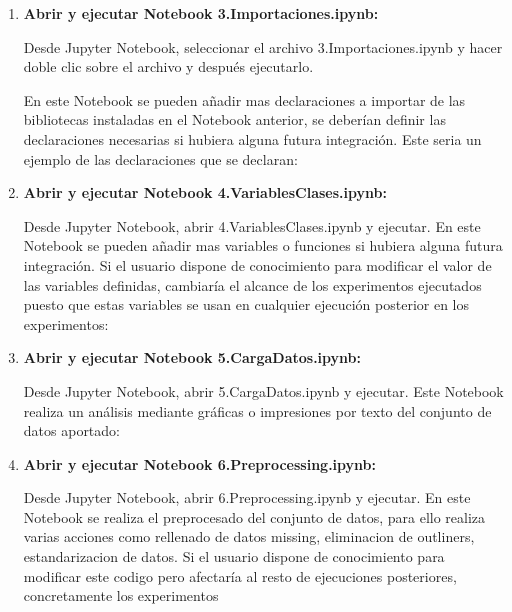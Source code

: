 \begin{enumerate}
\begin{enumerate}
    
    
   \item
    \textbf{Abrir y ejecutar Notebook 3.Importaciones.ipynb:} 
    
    Desde Jupyter Notebook, seleccionar el archivo 3.Importaciones.ipynb y hacer doble clic sobre el archivo y después ejecutarlo.
    
    En este Notebook se pueden añadir mas declaraciones a importar de las bibliotecas instaladas en el Notebook anterior, se deberían definir las declaraciones necesarias si hubiera alguna futura integración. Este seria un ejemplo de las declaraciones que se declaran:
    
    
   \item
    \textbf{Abrir y ejecutar Notebook 4.VariablesClases.ipynb:} 
    
    Desde Jupyter Notebook, abrir 4.VariablesClases.ipynb y ejecutar. En este Notebook se pueden añadir mas variables o funciones si hubiera alguna futura integración.
    Si el usuario dispone de conocimiento para modificar el valor de las variables definidas, cambiaría el alcance de los experimentos ejecutados puesto que estas variables se usan en cualquier ejecución posterior en los experimentos:
    
    
    \item
    \textbf{Abrir y ejecutar Notebook 5.CargaDatos.ipynb:} 
    
    Desde Jupyter Notebook, abrir 5.CargaDatos.ipynb y ejecutar. Este Notebook realiza un análisis mediante gráficas o impresiones por texto del conjunto de  datos aportado:
    
    
     \item
    \textbf{Abrir y ejecutar Notebook 6.Preprocessing.ipynb:} 
    
    Desde Jupyter Notebook, abrir 6.Preprocessing.ipynb y ejecutar. En este Notebook se realiza el preprocesado del conjunto de datos, para ello realiza varias acciones como rellenado de datos missing, eliminacion de outliners, estandarizacion de datos.
    Si el usuario dispone de conocimiento para modificar este codigo pero afectaría al resto de ejecuciones posteriores, concretamente los experimentos
    

\end{enumerate}
\end{enumerate}

